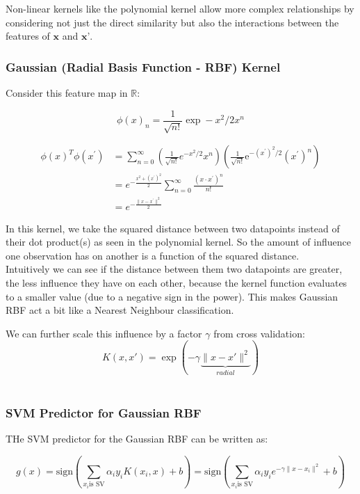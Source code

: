 Non-linear kernels like the polynomial kernel allow more complex relationships by considering not just the direct similarity but also the interactions between the features of \( \textbf{x} \) and \( \textbf{x'} \).

\subsubsection*{Gaussian (Radial Basis Function -  RBF) Kernel}

Consider this feature map in $\mathbb{R}$:

\[
\phi(x)_n=\frac1{\sqrt{n!}}\exp-x^2/2x^n
\]

\[
\begin{aligned}
\phi(x)^T\phi(x^{\prime})& =\sum_{n=0}^\infty\left(\frac1{\sqrt{n!}}e^{-x^2/2}x^n\right)\left(\frac1{\sqrt{n!}}\mathrm{e}^{-(x^{\prime})^2/2}(x^{\prime})^n\right)  \\
&=e^{-\frac{x^2+(x^{\prime})^2}2}\sum_{n=0}^\infty\frac{(x\cdot x^{\prime})^n}{n!} \\
&=e^{-\frac{\|x-x^{\prime}\|^2}2}
\end{aligned}
\]

In this kernel, we take the squared distance between two datapoints instead of their dot product(s) as seen in the polynomial kernel. So the amount of influence one observation has on another is a function of the squared distance. \\

Intuitively we can see if the distance between them two datapoints are greater, the less influence they have on each other, because the kernel function evaluates to a smaller value (due to a negative sign in the power). This makes Gaussian RBF act a bit like a Nearest Neighbour classification.

We can further scale this influence by a factor $\gamma$ from cross validation:
\[K(x,x')=\exp\left(-\gamma\underbrace{\|x-x'\|^2}_{radial}\right)\]\\

\subsubsection*{SVM Predictor for Gaussian RBF}

THe SVM predictor for the Gaussian RBF can be written as:

\[g(x)=\text{sign}\left(\sum_{x_i\text{is SV}}\alpha_iy_iK(x_i,x)+b\right)=\text{sign}\left(\sum_{x_i\text{is SV}}\alpha_iy_ie^{-\gamma\|x-x_i\|^2}+b\right)\]

